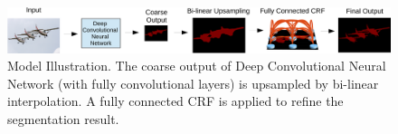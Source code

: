 





\begin{figure}
  \centering
  \includegraphics[width=1\linewidth]{fig/model_illustration.pdf}
  \caption{Model Illustration. The coarse output of Deep Convolutional Neural Network (with fully convolutional layers) is upsampled by bi-linear interpolation. A fully connected CRF is applied to refine the segmentation result.}
  \label{fig:ModelIllustration}
\end{figure}




 

